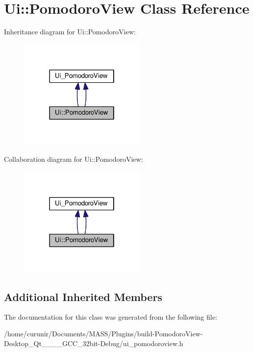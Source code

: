 \hypertarget{class_ui_1_1_pomodoro_view}{}\section{Ui\+:\+:Pomodoro\+View Class Reference}
\label{class_ui_1_1_pomodoro_view}


Inheritance diagram for Ui\+:\+:Pomodoro\+View\+:
\nopagebreak
\begin{figure}[H]
\begin{center}
\leavevmode
\includegraphics[width=178pt]{class_ui_1_1_pomodoro_view__inherit__graph}
\end{center}
\end{figure}


Collaboration diagram for Ui\+:\+:Pomodoro\+View\+:
\nopagebreak
\begin{figure}[H]
\begin{center}
\leavevmode
\includegraphics[width=178pt]{class_ui_1_1_pomodoro_view__coll__graph}
\end{center}
\end{figure}
\subsection*{Additional Inherited Members}


The documentation for this class was generated from the following file\+:\begin{DoxyCompactItemize}
\item 
/home/curunir/\+Documents/\+M\+A\+S\+S/\+Plugins/build-\/\+Pomodoro\+View-\/\+Desktop\+\_\+\+Qt\+\_\+\_\+\_\+\_\+\+G\+C\+C\+\_\+32bit-\/\+Debug/ui\+\_\+pomodoroview.\+h\end{DoxyCompactItemize}
